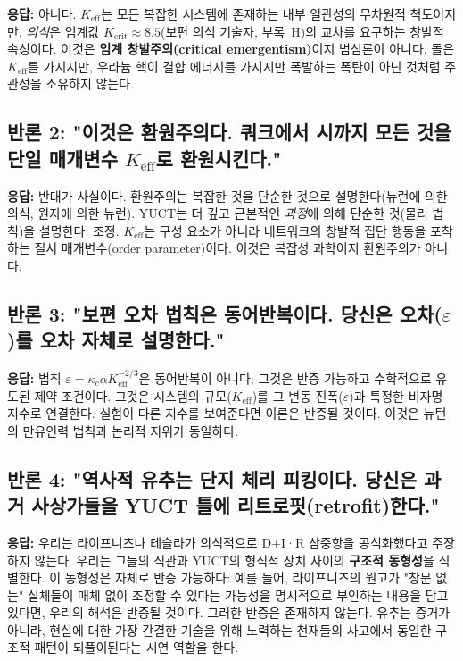 \documentclass[12pt,a4paper]{article}
\newcommand{\Keff}{K_{\mathrm{eff}}}
\begin{document}
	\textbf{응답:} 아니다. \(\Keff\)는 모든 복잡한 시스템에 존재하는 내부 일관성의 무차원적 척도이지만, \emph{의식}은 임계값 \(K_{\mathrm{crit}} \approx 8.5\)(보편 의식 기술자, 부록~H)의 교차를 요구하는 창발적 속성이다. 이것은 \textbf{임계 창발주의(critical emergentism)}이지 범심론이 아니다. 돌은 \(\Keff\)를 가지지만, 우라늄 핵이 결합 에너지를 가지지만 폭발하는 폭탄이 아닌 것처럼 주관성을 소유하지 않는다.
	
	\subsection*{반론 2: "이것은 환원주의다. 쿼크에서 시까지 모든 것을 단일 매개변수 \(\Keff\)로 환원시킨다."}
	
	\textbf{응답:} 반대가 사실이다. 환원주의는 복잡한 것을 단순한 것으로 설명한다(뉴런에 의한 의식, 원자에 의한 뉴런). YUCT는 더 깊고 근본적인 \emph{과정}에 의해 단순한 것(물리 법칙)을 설명한다: 조정. \(\Keff\)는 구성 요소가 아니라 네트워크의 창발적 집단 행동을 포착하는 질서 매개변수(order parameter)이다. 이것은 복잡성 과학이지 환원주의가 아니다.
	
	\subsection*{반론 3: "보편 오차 법칙은 동어반복이다. 당신은 오차(\(\varepsilon\))를 오차 자체로 설명한다."}
	
	\textbf{응답:} 법칙 \(\varepsilon = \kappa_c \alpha \Keff^{-2/3}\)은 동어반복이 아니다; 그것은 반증 가능하고 수학적으로 유도된 제약 조건이다. 그것은 시스템의 규모(\(\Keff\))를 그 변동 진폭(\(\varepsilon\))과 특정한 비자명 지수로 연결한다. 실험이 다른 지수를 보여준다면 이론은 반증될 것이다. 이것은 뉴턴의 만유인력 법칙과 논리적 지위가 동일하다.
	
	\subsection*{반론 4: "역사적 유추는 단지 체리 피킹이다. 당신은 과거 사상가들을 YUCT 틀에 리트로핏(retrofit)한다."}
	
	\textbf{응답:} 우리는 라이프니츠나 테슬라가 의식적으로 D+I·R 삼중항을 공식화했다고 주장하지 않는다. 우리는 그들의 직관과 YUCT의 형식적 장치 사이의 \textbf{구조적 동형성}을 식별한다. 이 동형성은 자체로 반증 가능하다: 예를 들어, 라이프니츠의 원고가 "창문 없는" 실체들이 매체 없이 조정할 수 있다는 가능성을 명시적으로 부인하는 내용을 담고 있다면, 우리의 해석은 반증될 것이다. 그러한 반증은 존재하지 않는다. 유추는 증거가 아니라, 현실에 대한 가장 간결한 기술을 위해 노력하는 천재들의 사고에서 동일한 구조적 패턴이 되풀이된다는 시연 역할을 한다.
	
\end{document}
